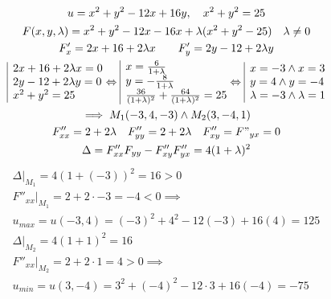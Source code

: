 \documentclass[a4paper,fleqn,12pt]{article}
\theoremstyle{definition}
\begin{document}
\begin{gather*}
u = x^2 + y^2 - 12x + 16y, \quad x^2 + y^2 = 25\\
F(x,y,\lambda) = x^2 + y^2 - 12x - 16x + \lambda(x^2 + y^2 - 25) \quad \lambda \neq 0\\
F'_x = 2x + 16 + 2\lambda x \qquad F'_y = 2y - 12 + 2\lambda y \\
\begin{array}{|l@{}}
2x + 16 + 2\lambda x = 0\\
2y - 12 + 2\lambda y = 0 \\
x^2 + y^2 = 25
\end{array}\Leftrightarrow 
\begin{array}{|l@{}}
x = \frac{6}{1 + \lambda} \\
y = - \frac{8}{1 + \lambda}\\
\frac{36}{(1+\lambda)^2} + \frac{64}{(1+ \lambda)^2}=25
\end{array}\Leftrightarrow
\begin{array}{|l@{}}
x = -3 \land x = 3\\
y = 4 \land y = -4\\
\lambda = -3 \land \lambda = 1
\end{array}\\
\implies M_1(-3,4,-3) \land M_2(3,-4,1)\\
F''_{xx} = 2+ 2\lambda \quad F''_{yy} = 2 + 2\lambda \quad F''_{xy} = F"_{yx} = 0\\
\Delta = F''_{xx}F_{yy} - F''_{xy}F''_{yx} = 4(1+\lambda)^2\\
\end{gather*}
\begin{gather*}
\Delta \Big|_{M_1} = 4(1+(-3))^2 = 16 > 0 \\
F''_{xx} \Big|_{M_1} = 2 + 2\cdot -3 = -4 < 0 \implies \\
u_{max} = u(-3,4) = (-3)^2 + 4^2 - 12(-3) + 16(4) = 125 \\
\Delta \Big|_{M_2} = 4(1+1)^2 = 16\\
F''_{xx} \Big|_{M_2} = 2 + 2 \cdot 1 = 4 >0 \implies \\
u_{min} = u(3,-4) = 3^2 + (-4)^2 - 12\cdot 3 + 16(-4) = -75
\end{gather*}
\end{document}

